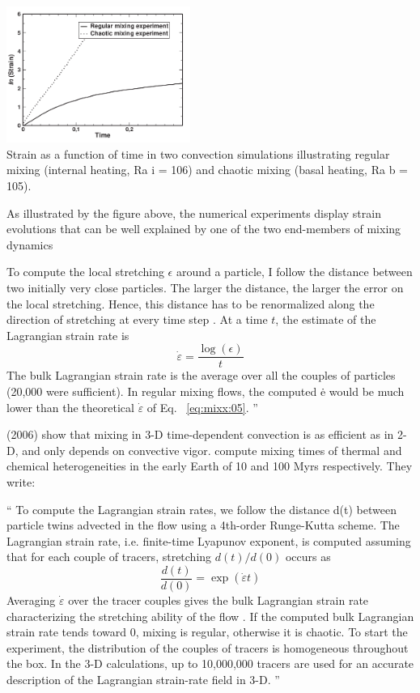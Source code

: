 \begin{displayquote}
{\begin{center}
\includegraphics[width=6cm]{images/mixing/colt05}\\
Strain as a function of time in two convection simulations
illustrating regular mixing (internal heating, Ra i = 106) and chaotic
mixing (basal heating, Ra b = 105).
\end{center}


As illustrated by the figure above, the numerical
experiments display strain evolutions that can be well
explained by one of the two end-members of mixing
dynamics

To compute the local stretching $\epsilon$ around a particle,
I follow the distance between two initially very close
particles. The larger the distance, the larger the error
on the local stretching. Hence, this distance has to be
renormalized along the direction of stretching at every
time step \cite{feri98}. At a time $t$, the estimate of the
Lagrangian strain rate is
\[
\dot\varepsilon = \frac{\log (\epsilon)}{t}
\]
The bulk Lagrangian strain rate is the average over
all the couples of particles (20,000 were sufficient). In
regular mixing flows, the computed ė would be much
lower than the theoretical $\dot{\varepsilon}$ of Eq.~
\eqref{eq:mixx:05}.
''
}
\end{displayquote}



\textcite{cosc06} (2006)
show that mixing in 3-D time-dependent convection is as efficient as
in 2-D, and only depends on convective vigor.
compute mixing times of thermal and chemical heterogeneities in
the early Earth of 10 and 100 Myrs respectively.
They write:
\begin{displayquote}
{\color{darkgray}
``
To compute the Lagrangian strain rates, we follow the
distance d(t) between particle twins advected in the flow
using a 4th-order Runge-Kutta scheme. The Lagrangian
strain rate, i.e. finite-time Lyapunov exponent, is computed
assuming that for each couple of tracers, stretching $d(t)/d(0)$
occurs as
\[
\frac{d(t)}{d(0)} = \exp ( \dot\varepsilon t)
\]
Averaging $\dot{\varepsilon}$ over the tracer couples gives the bulk
Lagrangian strain rate characterizing the stretching ability
of the flow \cite{colt05}. If the computed bulk
Lagrangian strain rate tends toward 0, mixing is regular,
otherwise it is chaotic. To start the experiment, the
distribution of the couples of tracers is homogeneous
throughout the box. In the 3-D calculations, up to
10,000,000 tracers are used for an accurate description of
the Lagrangian strain-rate field in 3-D.
''
}
\end{displayquote}




